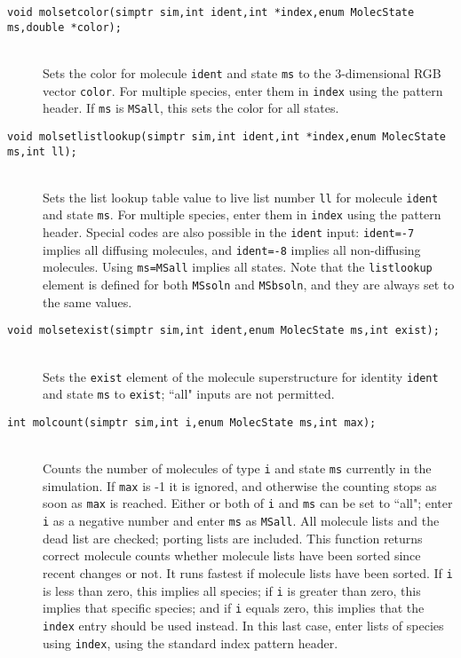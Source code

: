 \documentclass {book}
\begin{document}
\begin{description}
\item[\texttt{void molsetcolor(simptr sim,int ident,int *index,enum MolecState ms,double *color);}]
\hfill \\
Sets the color for molecule \texttt{ident} and state \texttt{ms} to the 3-dimensional RGB vector \texttt{color}.  For multiple species, enter them in \texttt{index} using the pattern header.  If \texttt{ms} is \texttt{MSall}, this sets the color for all states.

\item[\texttt{void molsetlistlookup(simptr sim,int ident,int *index,enum MolecState ms,int ll);}]
\hfill \\
Sets the list lookup table value to live list number \texttt{ll} for molecule \texttt{ident} and state \texttt{ms}.  For multiple species, enter them in \texttt{index} using the pattern header.  Special codes are also possible in the \texttt{ident} input:  \texttt{ident=-7} implies all diffusing molecules, and \texttt{ident=-8} implies all non-diffusing molecules.  Using \texttt{ms=MSall} implies all states. Note that the \texttt{listlookup} element is defined for both \texttt{MSsoln} and \texttt{MSbsoln}, and they are always set to the same values.

\item[\texttt{void molsetexist(simptr sim,int ident,enum MolecState ms,int exist);}]
\hfill \\
Sets the \texttt{exist} element of the molecule superstructure for identity \texttt{ident} and state \texttt{ms} to \texttt{exist}; ``all" inputs are not permitted.

\item[\texttt{int molcount(simptr sim,int i,enum MolecState ms,int max);}]
\hfill \\
Counts the number of molecules of type \texttt{i} and state \texttt{ms} currently in the simulation.  If \texttt{max} is -1 it is ignored, and otherwise the counting stops as soon as \texttt{max} is reached.  Either or both of \texttt{i} and \texttt{ms} can be set to ``all"; enter \texttt{i} as a negative number and enter \texttt{ms} as \texttt{MSall}.  All molecule lists and the dead list are checked; porting lists are included.  This function returns correct molecule counts whether molecule lists have been sorted since recent changes or not.  It runs fastest if molecule lists have been sorted.  If \texttt{i} is less than zero, this implies all species; if \texttt{i} is greater than zero, this implies that specific species; and if \texttt{i} equals zero, this implies that the \texttt{index} entry should be used instead.  In this last case, enter lists of species using \texttt{index}, using the standard index pattern header.


\end{description}
\end{document}
